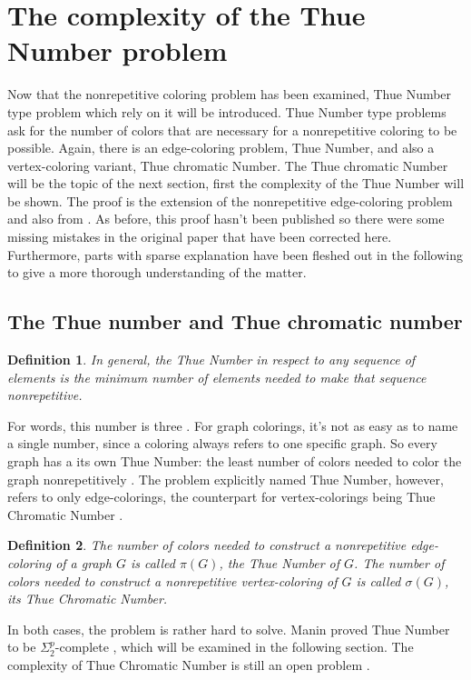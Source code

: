 \documentclass[12pt,a4paper]{article}
\newtheorem{definition}{Definition}
\begin{document}
\section{The complexity of the  Thue Number problem}

Now that the nonrepetitive coloring problem has been examined, Thue Number type problem which rely on it will be introduced. Thue Number type problems ask for the number of colors that are necessary for a nonrepetitive coloring to be possible. Again, there is an edge-coloring problem, Thue Number, and also a vertex-coloring variant, Thue chromatic Number. The Thue chromatic Number will be the topic of the next section, first the complexity of the Thue Number will be shown. The proof is the extension of the nonrepetitive edge-coloring problem and also from \citep{Manin2008}. As before, this proof hasn't been published so there were some missing mistakes in the original paper that have been corrected here. Furthermore, parts with sparse explanation have been fleshed out in the following to give a more thorough understanding of the matter. 

\subsection{The Thue number and Thue chromatic number}

\begin{definition}
In general, the Thue Number in respect to any sequence of elements is the minimum number of elements needed to make that sequence nonrepetitive.
\end{definition} 
For words, this number is three \citep{Thue1906}. For graph colorings, it's not as easy as to name a single number, since a coloring always refers to one specific graph. So every graph has a its own Thue Number: the least number of colors needed to color the graph nonrepetitively \citep{Alon2002}. The problem explicitly named Thue Number, however, refers to only edge-colorings, the counterpart for vertex-colorings being Thue Chromatic Number \citep{Schaefer2002}. 
\begin{definition}
The number of colors needed to construct a nonrepetitive edge-coloring of a graph $G$ is called $\pi(G)$, the Thue Number of $G$.
\newline
The number of colors needed to construct a nonrepetitive vertex-coloring of $G$ is called $\sigma(G)$, its Thue Chromatic Number.
\end{definition}
In both cases, the problem is rather hard to solve. Manin proved Thue Number to be $\Sigma^p_2$-complete \citep{Manin2008}, which will be examined in the following section. The complexity of Thue Chromatic Number is still an open problem \citep{Schaefer2002}.
\newpage
\end{document}
